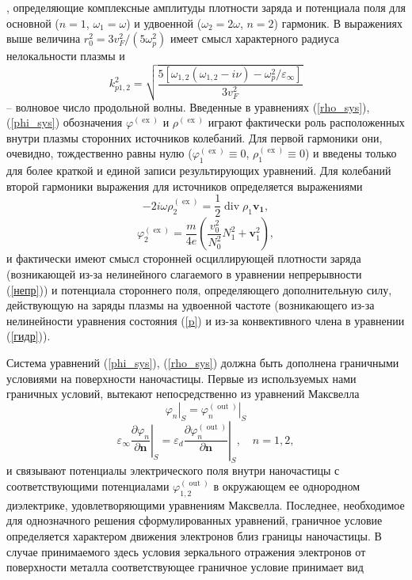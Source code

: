 \documentclass[12pt, a4paper]{article}
\renewcommand{\vec}{\mathbf}
\def \eps {\varepsilon}
\def \w {\omega}
\def \ph {\varphi}
\def \ex { \operatorname{ex}}
\def \out { \operatorname{out}}
\newcommand{\dn}[1]{\left.\frac{\partial #1}{\partial \vec{n}}\right|_{ S}}
\begin{document}
, определяющие комплексные амплитуды плотности заряда и потенциала поля для основной ($n=1$, $\w_1=\w$) и удвоенной ($\w_2=2\w$, $n=2$) гармоник.
В выражениях выше величина $r_0^2 = 3v_F^2/(5\w_p^2)$ имеет смысл характерного радиуса нелокальности плазмы и  
\begin{equation} 
k_{p1,2}^2 = \sqrt{\frac{5[\w_{1,2}(\w_{1,2} - i\nu) - \w_p^2/\eps_\infty]}{3v_F^2}} 
\end{equation}
-- волновое число продольной волны.
Введенные в уравнениях (\ref{rho_sys}), (\ref{phi_sys}) обозначения $\ph^{(\ex)}$ и $\rho^{(\ex)}$ играют фактически роль расположенных внутри плазмы сторонних источников колебаний. Для первой гармоники они, очевидно, тождественно равны нулю ($\ph^{(\ex)}_1\equiv0$, $\rho^{(\ex)}_1\equiv0$) и введены только для более краткой и единой записи результирующих уравнений. Для колебаний второй гармоники выражения для источников определяется выражениями 
\begin{equation}
	\label{rho_ex}
 - 2i\w \rho^{(\ex)}_2 = \frac{1}{2}\operatorname{div} \rho_1 \vec{v_1},
\end{equation}
\begin{equation}
	\label{phi_ex}
\ph^{(\ex)}_2 = \frac{m}{4e}\left(\frac{v_0^2}{N_0^2}N_1^2 + \vec{v}_1^2\right),
\end{equation}
и фактически имеют смысл сторонней осциллирующей плотности заряда (возникающей из-за нелинейного слагаемого в уравнении непрерывности (\ref{непр})) и потенциала стороннего поля, определяющего дополнительную силу, действующую на заряды плазмы на удвоенной частоте (возникающего из-за нелинейности уравнения состояния (\ref{p}) и из-за конвективного члена в уравнении (\ref{гидр})). 

Система уравнений (\ref{phi_sys}), (\ref{rho_sys}) должна быть дополнена граничными условиями на поверхности наночастицы. Первые из используемых нами граничных условий, вытекают непосредственно из уравнений Максвелла
\begin{equation} 
	\label{g_u1}
	\left. \ph_n \right|_{ S} = \left. \ph_n^{(\out)} \right|_{ S} 
\end{equation}
\begin{equation} 
	\label{g_u2}
	\eps_\infty \dn{\ph_n} = \eps_d \dn{\ph_n^{(\out)}}, \quad n = 1,2,  
\end{equation}
и связывают потенциалы электрического поля внутри наночастицы с соответствующими потенциалами $\ph_{1,2}^{(\out)}$ в окружающем ее однородном диэлектрике, удовлетворяющими уравнениям Максвелла.
Последнее, необходимое для однозначного решения сформулированных уравнений, граничное условие определяется характером движения электронов близ границы наночастицы. В случае принимаемого здесь условия зеркального отражения электронов от поверхности металла соответствующее граничное условие принимает вид
\end{document}
